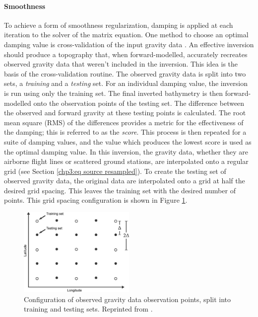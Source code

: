 \paragraph*{Smoothness}
To achieve a form of smoothness regularization, damping is applied at each iteration to the solver of the matrix equation. One method to choose an optimal damping value is cross-validation of the input gravity data \citep{uiedafast2017}. An effective inversion should produce a topography that, when forward-modelled, accurately recreates observed gravity data that weren't included in the inversion. This idea is the basis of the cross-validation routine. The observed gravity data is split into two sets, a \textit{training} and a \textit{testing} set. For an individual damping value, the inversion is run using only the training set. The final inverted bathymetry is then forward-modelled onto the observation points of the testing set. The difference between the observed and forward gravity at these testing points is calculated. The root mean square (RMS) of the differences provides a metric for the effectiveness of the damping; this is referred to as the \textit{score}. This process is then repeated for a suite of damping values, and the value which produces the lowest score is used as the optimal damping value. In this inversion, the gravity data, whether they are airborne flight lines or scattered ground stations, are interpolated onto a regular grid (see Section \ref{chp3:eq source resampled}). To create the testing set of observed gravity data, the original data are interpolated onto a grid at half the desired grid spacing. This leaves the training set with the desired number of points. This grid spacing configuration is shown in Figure \ref{fig:chp3_CV_grid_spacing}.

\begin{figure}[!ht]
    \centering
    \includegraphics[width=0.5\textwidth]{figures/chp3/chp3_CV_grid_spacing.jpg}
    \caption[Training and testing set configuration]{Configuration of observed gravity data observation points, split into training and testing sets. Reprinted from \citet{uiedafast2017}.}
    \label{fig:chp3_CV_grid_spacing}
\end{figure}


